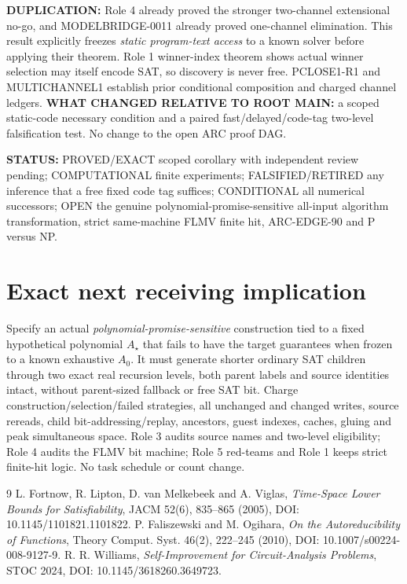 \documentclass[11pt]{article}
\begin{document}
\textbf{DUPLICATION:} Role 4 already proved the stronger two-channel extensional no-go, and MODELBRIDGE-0011 already proved one-channel elimination. This result explicitly freezes \emph{static program-text access} to a known solver before applying their theorem. Role 1 winner-index theorem shows actual winner selection may itself encode SAT, so discovery is never free. PCLOSE1-R1 and MULTICHANNEL1 establish prior conditional composition and charged channel ledgers. \textbf{WHAT CHANGED RELATIVE TO ROOT MAIN:} a scoped static-code necessary condition and a paired fast/delayed/code-tag two-level falsification test. No change to the open ARC proof DAG.

\textbf{STATUS:} PROVED/EXACT scoped corollary with independent review pending; COMPUTATIONAL finite experiments; FALSIFIED/RETIRED any inference that a free fixed code tag suffices; CONDITIONAL all numerical successors; OPEN the genuine polynomial-promise-sensitive all-input algorithm transformation, strict same-machine FLMV finite hit, ARC-EDGE-90 and P versus NP.

\section{Exact next receiving implication}
Specify an actual \emph{polynomial-promise-sensitive} construction tied to a fixed hypothetical polynomial $A_\star$ that fails to have the target guarantees when frozen to a known exhaustive $A_0$. It must generate shorter ordinary SAT children through two exact real recursion levels, both parent labels and source identities intact, without parent-sized fallback or free SAT bit. Charge construction/selection/failed strategies, all unchanged and changed writes, source rereads, child bit-addressing/replay, ancestors, guest indexes, caches, gluing and peak simultaneous space. Role 3 audits source names and two-level eligibility; Role 4 audits the FLMV bit machine; Role 5 red-teams and Role 1 keeps strict finite-hit logic. No task schedule or count change.

\begin{thebibliography}{9}
 L. Fortnow, R. Lipton, D. van Melkebeek and A. Viglas, \emph{Time-Space Lower Bounds for Satisfiability}, JACM 52(6), 835--865 (2005), DOI: 10.1145/1101821.1101822.
 P. Faliszewski and M. Ogihara, \emph{On the Autoreducibility of Functions}, Theory Comput. Syst. 46(2), 222--245 (2010), DOI: 10.1007/s00224-008-9127-9.
 R. R. Williams, \emph{Self-Improvement for Circuit-Analysis Problems}, STOC 2024, DOI: 10.1145/3618260.3649723.
\end{thebibliography}
\end{document}

